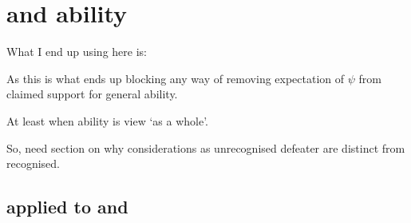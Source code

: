 




\newpage

\section{\nI{} and ability}
\label{sec:ni-ability}

\begin{note}
  \color{red}
  What I end up using here is:

  \begin{quote}
    \vspace{-\baselineskip}
    \propCSNai*
  \end{quote}
  As this is what ends up blocking any way of removing expectation of \(\psi\) from claimed support for general ability.

  At least when ability is view `as a whole'.

  So, need section on why considerations as unrecognised defeater are distinct from recognised.
\end{note}

\subsection{\nI{} applied to \gsi{} and \adA{}}
\label{sec:ni-ability:adA}

